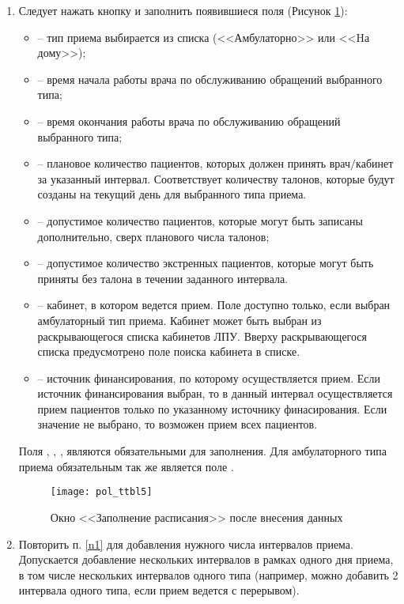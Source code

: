 {\begin{enumerate}
 \item \label{n1} Следует нажать кнопку  и заполнить появившиеся поля (Рисунок \ref{img_pol_ttbl5}):
 \begin{itemize}
  \item {} -- тип приема выбирается из списка (<<Амбулаторно>> или <<Hа дому>>);
  \item {} -- время начала работы врача по обслуживанию обращений выбранного типа;
  \item {} -- время окончания работы врача по обслуживанию обращений выбранного типа;
  \item {} -- плановое количество пациентов, которых должен принять врач$\slash$кабинет за указанный интервал. Соответствует количеству талонов, которые будут созданы на текущий день для выбранного типа приема. 
  \item {} -- допустимое количество пациентов, которые могут быть записаны дополнительно, сверх планового числа талонов;
  \item {} -- допустимое количество экстренных пациентов, которые могут быть приняты без талона в течении заданного интервала.
  \item {} -- кабинет, в котором ведется прием. Поле доступно только, если выбран амбулаторный тип приема. Кабинет может быть выбран из раскрывающегося списка кабинетов ЛПУ. Вверху раскрывающегося списка предусмотрено поле поиска кабинета в списке.
  \item {} -- источник финансирования, по которому осуществляется прием. Если источник финансирования выбран, то в данный интервал осуществляется прием пациентов только по указанному источнику финасирования. Если значение не выбрано, то возможен прием всех пациентов.
 \end{itemize}
 Поля , , ,  являются обязательными для заполнения.  Для амбулаторного типа приема обязательным так же является поле .

\begin{figure}[ht]\centering
 \texttt{[image: pol\_ttbl5]}
 \caption{Окно <<Заполнение расписания>> после внесения данных}
 \label{img_pol_ttbl5}
\end{figure}

 \item Повторить п. \ref{n1} для добавления нужного числа интервалов приема. Допускается добавление нескольких интервалов в рамках одного дня приема, в том числе нескольких интервалов одного типа (например, можно добавить 2 интервала одного типа, если прием ведется с перерывом). 
 

\end{enumerate}}
